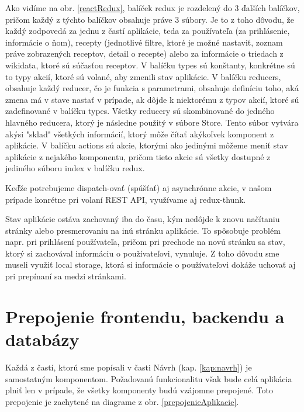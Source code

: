 Ako vidíme na obr. \ref{reactRedux}, balíček redux je rozdelený do 3 ďalších balíčkov, pričom každý z týchto balíčkov obsahuje práve 3 súbory. Je to z toho dôvodu, že každý zodpovedá za jednu z častí aplikácie, teda za používateľa (za prihlásenie, informácie o ňom), recepty (jednotlivé filtre, ktoré je možné nastaviť, zoznam práve zobrazených receptov, detail o recepte) alebo za informácie o triedach z wikidata, ktoré sú súčasťou receptov. V balíčku types sú konštanty, konkrétne sú to typy akcií, ktoré sú volané, aby zmenili stav aplikácie. V balíčku reducers, obsahuje každý reducer, čo je funkcia s parametrami, obsahuje definíciu toho, aká zmena má v stave nastať v prípade, ak dôjde k niektorému z typov akcií, ktoré sú zadefinované v balíčku types. Všetky reducery sú skombinované do jedného hlavného reducera, ktorý je následne použitý v súbore Store. Tento súbor vytvára akýsi "sklad" všetkých informácií, ktorý môže čítať akýkoľvek komponent z aplikácie. V balíčku actions sú akcie, ktorými ako jedinými môžeme meniť stav aplikácie z nejakého komponentu, pričom tieto akcie sú všetky dostupné z jediného súboru index v balíčku redux. 

Keďže potrebujeme dispatch-ovať (spúšťať) aj asynchrónne akcie, v našom prípade konrétne pri volaní REST API, využívame aj redux-thunk. 

Stav aplikácie ostáva zachovaný iba do času, kým nedôjde k znovu načítaniu stránky alebo presmerovaniu na inú stránku aplikácie. To spôsobuje problém napr. pri prihlásení používateľa, pričom pri prechode na novú stránku sa stav, ktorý si zachovával informáciu o používateľovi, vynuluje. Z toho dôvodu sme museli využiť local storage, ktorá si informácie o používateľovi dokáže uchovať aj pri prepínaní sa medzi stránkami. 

\section{Prepojenie frontendu, backendu a databázy}
Každá z častí, ktorú sme popísali v časti Návrh (kap. \ref{kap:navrh}) je samostatným komponentom. Požadovanú funkcionalitu však bude celá aplikácia plniť len v prípade, že všetky komponenty budú vzájomne prepojené. Toto prepojenie je zachytené na diagrame z obr. \ref{prepojenieAplikacie}.   

